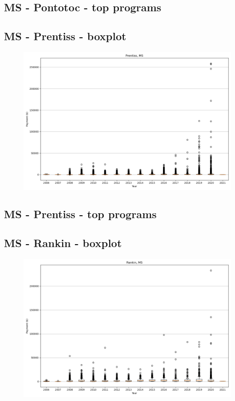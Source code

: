\subsection*{MS - Pontotoc - top programs}

\newpage
\subsection*{MS - Prentiss - boxplot}
\begin{figure}[h]
\centering
\includegraphics[width=7in]{../output/boxplots/counties/Prentiss-MS_boxplot.png}
\end{figure}


\subsection*{MS - Prentiss - top programs}

\newpage
\subsection*{MS - Rankin - boxplot}
\begin{figure}[h]
\centering
\includegraphics[width=7in]{../output/boxplots/counties/Rankin-MS_boxplot.png}
\end{figure}


